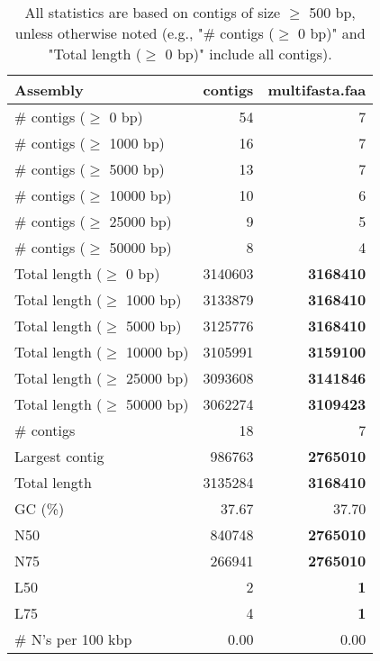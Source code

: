 \documentclass[12pt,a4paper]{article}
\begin{document}
\begin{table}[ht]
\begin{center}
\caption{All statistics are based on contigs of size $\geq$ 500 bp, unless otherwise noted (e.g., "\# contigs ($\geq$ 0 bp)" and "Total length ($\geq$ 0 bp)" include all contigs).}
\begin{tabular}{|l*{2}{|r}|}
\hline
Assembly & contigs & multifasta.faa \\ \hline
\# contigs ($\geq$ 0 bp) & 54 & 7 \\ \hline
\# contigs ($\geq$ 1000 bp) & 16 & 7 \\ \hline
\# contigs ($\geq$ 5000 bp) & 13 & 7 \\ \hline
\# contigs ($\geq$ 10000 bp) & 10 & 6 \\ \hline
\# contigs ($\geq$ 25000 bp) & 9 & 5 \\ \hline
\# contigs ($\geq$ 50000 bp) & 8 & 4 \\ \hline
Total length ($\geq$ 0 bp) & 3140603 & {\bf 3168410} \\ \hline
Total length ($\geq$ 1000 bp) & 3133879 & {\bf 3168410} \\ \hline
Total length ($\geq$ 5000 bp) & 3125776 & {\bf 3168410} \\ \hline
Total length ($\geq$ 10000 bp) & 3105991 & {\bf 3159100} \\ \hline
Total length ($\geq$ 25000 bp) & 3093608 & {\bf 3141846} \\ \hline
Total length ($\geq$ 50000 bp) & 3062274 & {\bf 3109423} \\ \hline
\# contigs & 18 & 7 \\ \hline
Largest contig & 986763 & {\bf 2765010} \\ \hline
Total length & 3135284 & {\bf 3168410} \\ \hline
GC (\%) & 37.67 & 37.70 \\ \hline
N50 & 840748 & {\bf 2765010} \\ \hline
N75 & 266941 & {\bf 2765010} \\ \hline
L50 & 2 & {\bf 1} \\ \hline
L75 & 4 & {\bf 1} \\ \hline
\# N's per 100 kbp & 0.00 & 0.00 \\ \hline
\end{tabular}
\end{center}
\end{table}
\end{document}
